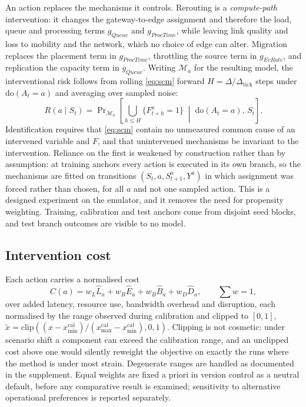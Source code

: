 \documentclass[journal]{IEEEtran}
\begin{document}
An action replaces the mechanisms it controls. Rerouting is a
\emph{compute-path} intervention: it changes the gateway-to-edge assignment and
therefore the load, queue and processing terms
$g_{\textit{Queue}}$ and $g_{\textit{ProcTime}}$, while leaving link quality and
loss to mobility and the network, which no choice of edge can alter. Migration
replaces the placement term in $g_{\textit{ProcTime}}$, throttling the source
term in $g_{\textit{EvRate}}$, and replication the capacity term in
$g_{\textit{Queue}}$. Writing $\mathcal{M}_a$ for the resulting model, the
interventional risk follows from rolling \eqref{eq:scm} forward
$H=\Delta/\Delta_{\mathrm{tick}}$ steps under $\mathrm{do}(A_t=a)$ and averaging
over sampled noise:
\begin{equation}
R(a\mid S_t)=\Pr\nolimits_{\mathcal{M}_a}\!\left[\textstyle\bigcup_{h\le H}
\{F^{a}_{t+h}=1\}\;\middle|\;\mathrm{do}(A_t=a),\,S_t\right].
\label{eq:int}
\end{equation}
Identification requires that \eqref{eq:scm} contain no unmeasured common cause
of an intervened variable and $F$, and that unintervened mechanisms be invariant
to the intervention. Reliance on the first is weakened by construction rather
than by assumption: at training anchors every action is executed in its own
branch, so the mechanisms are fitted on transitions
$(S_t,a,S^{a}_{t+1},Y^{a})$ in which assignment was forced rather than chosen,
for all $a$ and not one sampled action. This is a designed experiment on the
emulator, and it removes the need for propensity weighting. Training,
calibration and test anchors come from disjoint seed blocks, and test branch
outcomes are visible to no model.

\subsection{Intervention cost}
Each action carries a normalised cost
\begin{equation}
C(a)=w_L\hat{L}_a+w_R\hat{E}_a+w_B\hat{B}_a+w_D\hat{D}_a,
\qquad \textstyle\sum w=1,
\label{eq:cost}
\end{equation}
over added latency, resource use, bandwidth overhead and disruption, each
normalised by the range observed during calibration and clipped to $[0,1]$,
$\tilde{x}=\mathrm{clip}\!\left((x-x^{\mathrm{cal}}_{\min})/
(x^{\mathrm{cal}}_{\max}-x^{\mathrm{cal}}_{\min}),0,1\right)$. Clipping is not
cosmetic: under scenario shift a component can exceed the calibration range, and
an unclipped cost above one would silently reweight the objective on exactly the
runs where the method is under most strain. Degenerate ranges are handled as
documented in the supplement. Equal weights are fixed a priori in version
control as a neutral default, before any comparative result is examined;
sensitivity to alternative operational preferences is reported separately.
\end{document}
